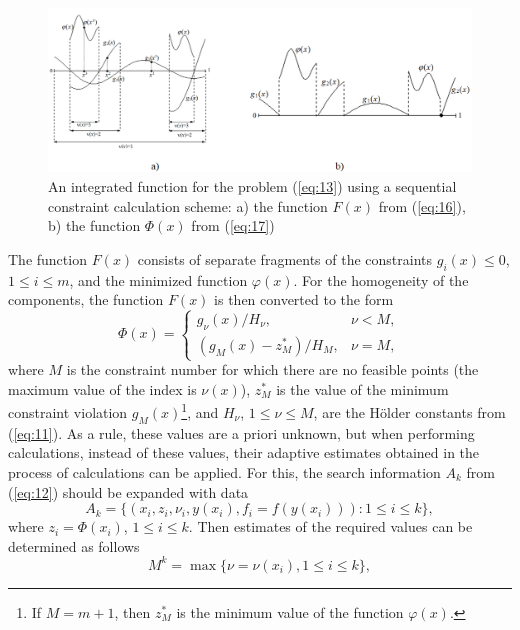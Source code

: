 \documentclass[smallextended]{svjour3}       %
\begin{document}
\begin{figure}
  \centering
  \includegraphics[width=\linewidth]{fig1}
  \caption{An integrated function for the problem (\ref{eq:13}) using a sequential constraint calculation scheme: a) the function $F(x)$ from (\ref{eq:16}), b) the function $\Phi(x)$ from (\ref{eq:17})}
  \label{fig:1}
\end{figure}

The function $F(x)$ consists of separate fragments of the constraints $g_i(x) \leq 0$, $1 \leq i \leq m$, and the minimized function $\varphi(x)$. For the homogeneity of the components, the function $F(x)$ is then converted to the form 
\begin{equation}\label{eq:17}
\Phi (x) = 
 \begin{cases}
   g_\nu(x) / H_\nu, & \nu < M, \\
   (g_M(x)-z^*_M) / H_M, & \nu = M,
 \end{cases}
\end{equation}
where $M$ is the constraint number for which there are no feasible points (the maximum value of the index is $\nu(x)$), $z^*_M$ is the value of the minimum constraint violation $g_M(x)$\footnote{If $M=m+1$, then $z_M^*$ is the minimum value of the function $\varphi(x)$.}, and $H_\nu$, $1\leq \nu \leq M$, are the H\"older constants from (\ref{eq:11}). As a rule, these values are a priori unknown, but when performing calculations, instead of these values, their adaptive estimates obtained in the process of calculations can be applied. For this, the search information $A_k$ from (\ref{eq:12}) should be expanded with data
\begin{equation}\label{eq:18}
A_k=\{(x_i, z_i, \nu_i, y(x_i), f_i=f( y(x_i))): 1 \leq i \leq k \},
\end{equation}
where $z_i= \Phi(x_i)$, $1 \leq i \leq k$. Then estimates of the required values can be determined as follows
\begin{equation}\label{eq:19}
M^k= \max{\{\nu=\nu(x_i), 1\leq i \leq k \}},
\end{equation}
\end{document}
